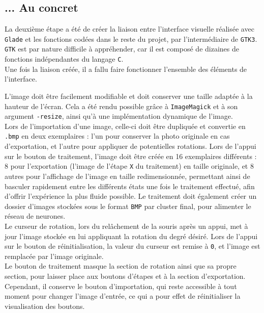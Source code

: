 \documentclass{article}
\begin{document}
\subsection{... Au concret}
La deuxième étape a été de créer la liaison entre l'interface visuelle réalisée avec \texttt{Glade} et les fonctions codées dans le reste du projet, par l'intermédiaire de \texttt{GTK3}. \texttt{GTK} est par nature difficile à appréhender, car il est composé de dizaines de fonctions indépendantes du langage \texttt{C}.\\

Une fois la liaison créée, il a fallu faire fonctionner l'ensemble des éléments de l'interface.

L'image doit être facilement modifiable et doit conserver une taille adaptée à la hauteur de l'écran. Cela a été rendu possible grâce à \texttt{ImageMagick} et à son argument \texttt{-resize}, ainsi qu'à une implémentation dynamique de l'image.\\

Lors de l'importation d'une image, celle-ci doit être dupliquée et convertie en \texttt{.bmp} en deux exemplaires : l'un pour conserver la photo originale en cas d'exportation, et l'autre pour appliquer de potentielles rotations. Lors de l'appui sur le bouton de traitement, l'image doit être créée en 16 exemplaires différents : 8 pour l'exportation (l'image de l'étape \texttt{X} du traitement) en taille originale, et 8 autres pour l'affichage de l'image en taille redimensionnée, permettant ainsi de basculer rapidement entre les différents états une fois le traitement effectué, afin d'offrir l'expérience la plus fluide possible. Le traitement doit également créer un dossier d'images stockées sous le format \texttt{BMP} par cluster final, pour alimenter le réseau de neurones.\\

Le curseur de rotation, lors du relâchement de la souris après un appui, met à jour l'image stockée en lui appliquant la rotation du degré désiré. Lors de l'appui sur le bouton de réinitialisation, la valeur du curseur est remise à \texttt{0}, et l'image est remplacée par l'image originale.\\

Le bouton de traitement masque la section de rotation ainsi que sa propre section, pour laisser place aux boutons d'étapes et à la section d'exportation. Cependant, il conserve le bouton d'importation, qui reste accessible à tout moment pour changer l'image d'entrée, ce qui a pour effet de réinitialiser la visualisation des boutons.\\
\end{document}
